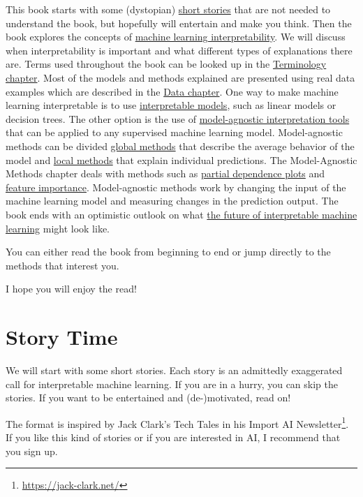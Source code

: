 \documentclass[
  11pt,
]{scrbook}
\renewcommand{\href}[2]{#2\footnote{\url{#1}}}
\begin{document}
This book starts with some (dystopian) \protect\hyperlink{storytime}{short stories} that are not needed to understand the book, but hopefully will entertain and make you think.
Then the book explores the concepts of \protect\hyperlink{interpretability}{machine learning interpretability}.
We will discuss when interpretability is important and what different types of explanations there are.
Terms used throughout the book can be looked up in the \protect\hyperlink{terminology}{Terminology chapter}.
Most of the models and methods explained are presented using real data examples which are described in the \protect\hyperlink{data}{Data chapter}.
One way to make machine learning interpretable is to use \protect\hyperlink{simple}{interpretable models}, such as linear models or decision trees.
The other option is the use of \protect\hyperlink{agnostic}{model-agnostic interpretation tools} that can be applied to any supervised machine learning model.
Model-agnostic methods can be divided \protect\hyperlink{global-methods}{global methods} that describe the average behavior of the model and \protect\hyperlink{local-methods}{local methods} that explain individual predictions.
The Model-Agnostic Methods chapter deals with methods such as \protect\hyperlink{pdp}{partial dependence plots} and \protect\hyperlink{feature-importance}{feature importance}.
Model-agnostic methods work by changing the input of the machine learning model and measuring changes in the prediction output.
The book ends with an optimistic outlook on what \protect\hyperlink{future}{the future of interpretable machine learning} might look like.

You can either read the book from beginning to end or jump directly to the methods that interest you.

I hope you will enjoy the read!

\newpage

\hypertarget{storytime}{%
\section{Story Time}\label{storytime}}

We will start with some short stories.
Each story is an admittedly exaggerated call for interpretable machine learning.
If you are in a hurry, you can skip the stories.
If you want to be entertained and (de-)motivated, read on!

The format is inspired by Jack Clark's Tech Tales in his \href{https://jack-clark.net/}{Import AI Newsletter}.
If you like this kind of stories or if you are interested in AI, I recommend that you sign up.
\end{document}
